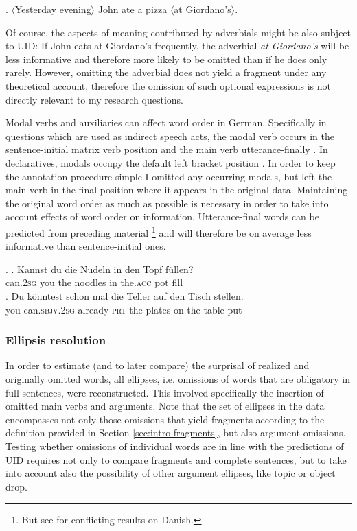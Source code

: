 \ex. $\langle$Yesterday evening$\rangle$ John ate a pizza $\langle$at Giordano's$\rangle$.

Of course, the aspects of meaning contributed by adverbials might be also subject to UID: If John eats at Giordano's frequently, the adverbial \textit{at Giordano's} will be less informative and therefore more likely to be omitted than if he does only rarely. However, omitting the adverbial does not yield a fragment under any theoretical account, therefore the omission of such optional expressions is not directly relevant to my research questions.

Modal verbs and auxiliaries can affect word order in German. Specifically in questions which are used as indirect speech acts, the modal verb occurs in the sentence-initial matrix verb position and the main verb utterance-finally \Next[a]. In declaratives, modals occupy the default left bracket position \Next[b]. In order to keep the annotation procedure simple I omitted any occurring modals, but left the main verb in the final position where it appears in the original data. Maintaining the original word order as much as possible is necessary in order to take into account effects of word order on information. Utterance-final words can be predicted from preceding material \citep{levy2008}%
%
\footnote{But see \citet{balling.kizach2017} for conflicting results on Danish.}\afterfn%
%
and will therefore be on average less informative than sentence-initial ones.

\ex. \ag. Kannst du die Nudeln in den Topf füllen?\\
can.\textsc{2sg} you the noodles in the.\textsc{acc} pot fill\\
\bg. Du könntest schon mal die Teller auf den Tisch stellen.\\
you can.\textsc{sbjv.2sg} already \textsc{prt} the plates on the table put\\

\subsubsection{Ellipsis resolution}

In order to estimate (and to later compare) the surprisal of realized and originally omitted words, all ellipses, i.e. omissions of words that are obligatory in full sentences, were reconstructed. This involved specifically the insertion of omitted main verbs and arguments. Note that the set of ellipses in the data encompasses not only those omissions that yield fragments according to the definition provided in Section \ref{sec:intro-fragments}, but also argument omissions. Testing whether omissions of individual words are in line with the predictions of UID requires not only to compare fragments and complete sentences, but to take into account also the possibility of other argument ellipses, like topic or object drop.

